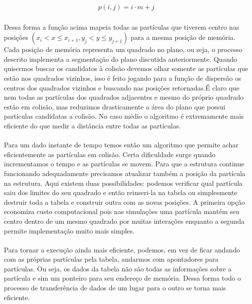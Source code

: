 \documentclass[a4paper,11pt]{article}
\begin{document}
\begin{eqnarray}
    p(i,j) = i\cdot m + j
\end{eqnarray} 

\paragraph{}Dessa forma a função acima mapeia todas as partículas que tiverem centro nas posições
$(x_i < x \leq x_{i+1}, y_j < y \leq y_{j+1})$ para a mesma
posição de memória. Cada posição de memória representa um quadrado
no plano, ou seja, o processo descrito implementa
a segmentação do plano discutida anteriormente. 
Quando quisermos buscar os candidatos à colisão devemos olhar somente
as partículas que estão nos quadrados vizinhos, isso é feito jogando
para a função de dispersão os centros dos quadrados vizinhos e buscando 
nas posições retornadas.É claro que nem todas as partículas dos quadrados adjacentes
e mesmo do próprio quadrado estão em colisão, mas reduzimos drasticamente a área do plano
que possui partículas candidatas a colisão. No caso médio o algoritmo é extremamente
mais eficiente do que medir a distância entre todas as partículas.

\paragraph{}Para um dado instante de tempo temos então um algoritmo que permite
achar eficientemente as partículas em colisão. Certa dificuldade surge quando 
incrementamos o tempo e as partículas se movem. Para que a estrutura continue 
funcionando adequadamente precisamos atualizar também a posição da partícula 
na estrutura. Aqui existem duas possibilidades: podemos verificar qual partícula 
saiu dos limites do seu quadrado e então reinseri-la na tabela ou simplesmente 
destruir toda a tabela e construir outra com as novas posições. A primeira opção
economiza custo computacional pois nas simulações uma partícula mantém seu centro
dentro de um mesmo quadrado por muitas interações enquanto a segunda permite
implementação muito mais simples.

\paragraph{}Para tornar a execução ainda mais eficiente, podemos, em vez de ficar
andando com as próprias partículas pela tabela, andarmos com apontadores para partículas. 
Ou seja, os dados da tabela não são todas as informações sobre a partícula e sim
um ponteiro para seu endereço de memória. Dessa forma todo o processo de transferência
de dados de um lugar para o outro se torna mais eficiente.
\end{document}
